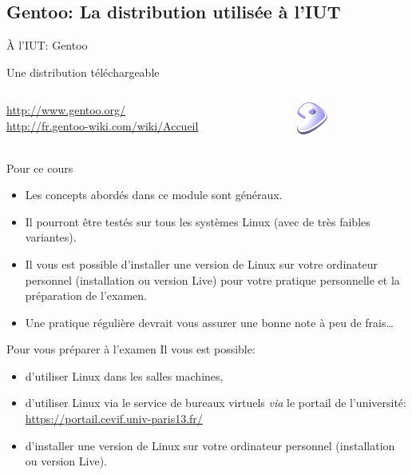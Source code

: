 \subsection{Gentoo: La distribution utilisée à l'IUT}
\begin{frame}{À l'IUT: Gentoo}
  \begin{block}{Une distribution téléchargeable}
    \begin{columns}
      \begin{column}{8cm}
        \url{http://www.gentoo.org/}\\
        \url{http://fr.gentoo-wiki.com/wiki/Accueil}
      \end{column}
      \begin{column}{3cm}
        \includegraphics[width=1cm]{img/s01/gentoo_logo.png}
      \end{column}
    \end{columns}
  \end{block}
  \begin{block}{Pour ce cours}
    \begin{itemize}
    \item Les concepts abordés dans ce module sont généraux.
    \item Il pourront être testés sur tous les systèmes Linux (avec de très faibles variantes).
    \item Il vous est possible d'installer une version de Linux sur votre ordinateur personnel (installation ou version Live) pour votre pratique personnelle et la préparation de l'examen.
    \item Une pratique régulière devrait vous assurer une bonne note à peu de frais\dots
    \end{itemize}
  \end{block}
  \begin{alertblock}{Pour vous préparer à l'examen}
    Il vous est possible:
    \begin{itemize}
    \item d'utiliser Linux dans les salles machines,
    \item d'utiliser Linux via le service de bureaux virtuels \textit{via} le portail de l'université:\\ \url{https://portail.cevif.univ-paris13.fr/}
    \item d'installer une version de Linux sur votre ordinateur personnel (installation ou version Live).
    \end{itemize}
  \end{alertblock}
\end{frame}

